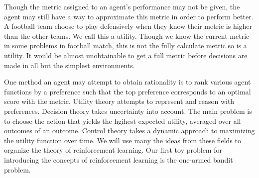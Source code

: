 \documentclass{report}
\begin{document}
Though the metric assigned to an agent's performance may not be given, the agent may still have a way to approximate this metric in order to perform better. A football team choose to play defensively when they know their metric is higher than the other teams. We call this a utility. 
Though we know the current metric in some problems in football match, this is not the fully calculate metric so is a utility. It would be almost unobtainable to get a full metric before decisions are made in all but the simplest environments.

One method an agent may attempt to obtain rationality is to rank various agent functions by a preference such that the top preference corresponds to an optimal score with the metric. Utility theory attempts to represent and reason with preferences. Decision theory takes uncertainty into account. The main problem is to choose the action that yields the hgihest expected utility, averaged over all outcomes of an outcome. Control theory takes a dynamic approach to maximizing the utility function over time. We will use many the ideas from these fields to organize the theory of reinforcement learning. Our first toy problem for introducing the concepts of reinforcement learning is the one-armed bandit problem.
\end{document}
